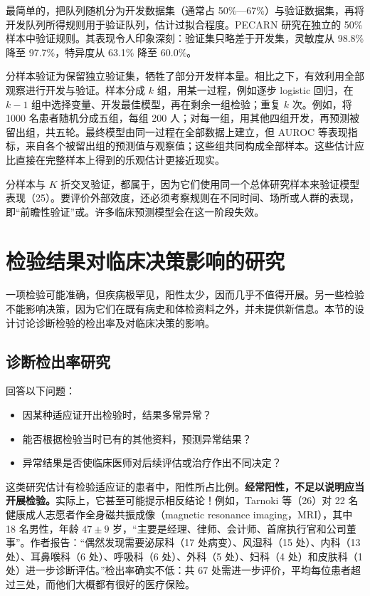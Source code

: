 最简单的，把队列随机分为开发数据集（通常占 50\%—67\%）与验证数据集，再将开发队列所得规则用于验证队列，估计过拟合程度。PECARN 研究在独立的 50\% 样本中验证规则。其表现令人印象深刻：验证集只略差于开发集，灵敏度从 98.8\% 降至 97.7\%，特异度从 63.1\% 降至 60.0\%。

分样本验证为保留独立验证集，牺牲了部分开发样本量。相比之下，有效利用全部观察进行开发与验证。样本分成 $k$ 组，用某一过程，例如逐步 logistic 回归，在 $k-1$ 组中选择变量、开发最佳模型，再在剩余一组检验；重复 $k$ 次。例如，将 1000 名患者随机分成五组，每组 200 人；对每一组，用其他四组开发，再预测被留出组，共五轮。最终模型由同一过程在全部数据上建立，但 AUROC 等表现指标，来自各个被留出组的预测值与观察值；这些组共同构成全部样本。这些估计应比直接在完整样本上得到的乐观估计更接近现实。

分样本与 $K$ 折交叉验证，都属于，因为它们使用同一个总体研究样本来验证模型表现（25）。要评价外部效度，还必须考察规则在不同时间、场所或人群的表现，即“前瞻性验证”或。许多临床预测模型会在这一阶段失效。

\section{检验结果对临床决策影响的研究}
一项检验可能准确，但疾病极罕见，阳性太少，因而几乎不值得开展。另一些检验不能影响决策，因为它们在既有病史和体检资料之外，并未提供新信息。本节的设计讨论诊断检验的检出率及对临床决策的影响。

\subsection{诊断检出率研究}
回答以下问题：
\begin{itemize}
\item 因某种适应证开出检验时，结果多常异常？
\item 能否根据检验当时已有的其他资料，预测异常结果？
\item 异常结果是否使临床医师对后续评估或治疗作出不同决定？
\end{itemize}
这类研究估计有检验适应证的患者中，阳性所占比例。\textbf{经常阳性，不足以说明应当开展检验。}实际上，它甚至可能提示相反结论！例如，Tarnoki 等（26）对 22 名健康成人志愿者作全身磁共振成像（magnetic resonance imaging，MRI），其中 18 名男性，年龄 $47\pm9$ 岁，“主要是经理、律师、会计师、首席执行官和公司董事”。作者报告：“偶然发现需要泌尿科（17 处病变）、风湿科（15 处）、内科（13 处）、耳鼻喉科（6 处）、呼吸科（6 处）、外科（5 处）、妇科（4 处）和皮肤科（1 处）进一步诊断评估。”检出率确实不低：共 67 处需进一步评价，平均每位患者超过三处，而他们大概都有很好的医疗保险。

